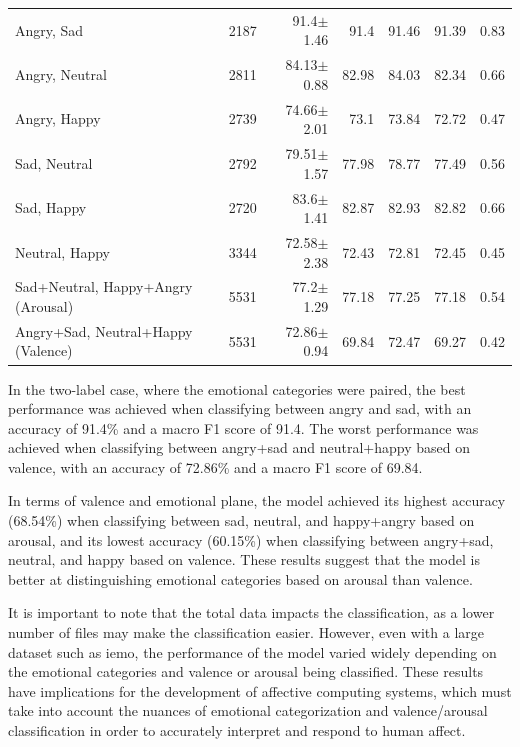 \begin{table}[H]
\begin{tabular}{lrrrrrr}
    	Angry, Sad                          &         2187 & 91.4$\pm$1.46  &      91.4  &       91.46 &    91.39 &   0.83 \\
    	Angry, Neutral                      &         2811 & 84.13$\pm$0.88 &      82.98 &       84.03 &    82.34 &   0.66 \\
    	Angry, Happy                    &         2739 & 74.66$\pm$2.01 &      73.1  &       73.84 &    72.72 &   0.47 \\
    	Sad, Neutral                        &         2792 & 79.51$\pm$1.57 &      77.98 &       78.77 &    77.49 &   0.56 \\
    	Sad, Happy                          &         2720 & 83.6$\pm$1.41  &      82.87 &       82.93 &    82.82 &   0.66 \\
    	Neutral, Happy                      &         3344 & 72.58$\pm$2.38 &      72.43 &       72.81 &    72.45 &   0.45 \\
    	Sad+Neutral, Happy+Angry (Arousal)  &         5531 & 77.2$\pm$1.29  &      77.18 &       77.25 &    77.18 &   0.54 \\
    	Angry+Sad, Neutral+Happy (Valence)  &         5531 & 72.86$\pm$0.94 &      69.84 &       72.47 &    69.27 &   0.42 \\
    	\bottomrule
    \end{tabular}
\end{table}

In the two-label case, where the emotional categories were paired, the best performance was achieved when classifying between angry and sad, with an accuracy of 91.4\% and a macro F1 score of 91.4. The worst performance was achieved when classifying between angry+sad and neutral+happy based on valence, with an accuracy of 72.86\% and a macro F1 score of 69.84.

In terms of valence and emotional plane, the model achieved its highest accuracy (68.54\%) when classifying between sad, neutral, and happy+angry based on arousal, and its lowest accuracy (60.15\%) when classifying between angry+sad, neutral, and happy based on valence. These results suggest that the model is better at distinguishing emotional categories based on arousal than valence.

It is important to note that the total data impacts the classification, as a lower number of files may make the classification easier. However, even with a large dataset such as \ac{iemo}, the performance of the model varied widely depending on the emotional categories and valence or arousal being classified. These results have implications for the development of affective computing systems, which must take into account the nuances of emotional categorization and valence/arousal classification in order to accurately interpret and respond to human affect.


